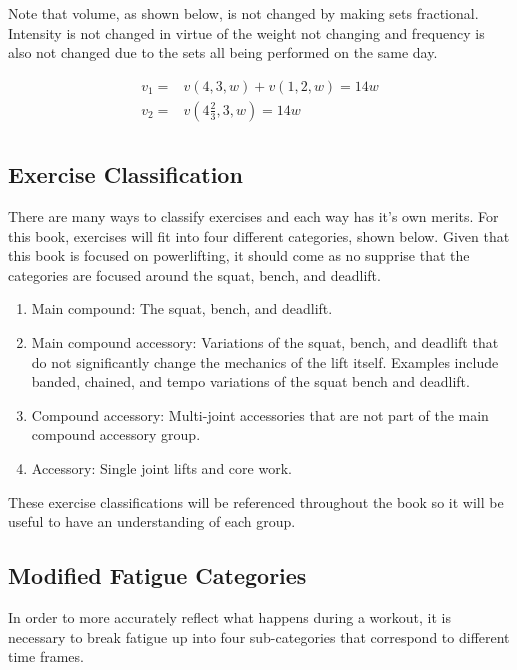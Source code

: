 Note that volume, as shown below, is not changed by making sets fractional. Intensity is not changed in virtue of the weight not changing and frequency is also not changed due to the sets all being performed on the same day.

\begin{equation*}
    \begin{split}
        v_1=&v(4,3,w)+v(1,2,w)=14w \\
        v_2=&v\left(4\frac{2}{3},3,w\right)=14w \\
    \end{split}
\end{equation*}

\subsection{Exercise Classification}
\label{sec:ExerciseClassification}

There are many ways to classify exercises and each way has it's own merits. For this book, exercises will fit into four different categories, shown below. Given that this book is focused on powerlifting, it should come as no supprise that the categories are focused around the squat, bench, and deadlift.

\begin{enumerate}
	\item Main compound: The squat, bench, and deadlift.
	\item Main compound accessory: Variations of the squat, bench, and deadlift that do not significantly change the mechanics of the lift itself. Examples include banded, chained, and tempo variations of the squat bench and deadlift.
	\item Compound accessory: Multi-joint accessories that are not part of the main compound accessory group.
	\item Accessory: Single joint lifts and core work.
\end{enumerate}

These exercise classifications will be referenced throughout the book so it will be useful to have an understanding of each group.


\subsection{Modified Fatigue Categories}
\label{sec:ModifiedFatigueCategories}

In order to more accurately reflect what happens during a workout, it is necessary to break fatigue up into four sub-categories that correspond to different time frames.

